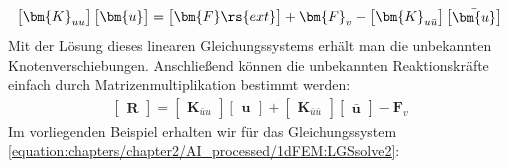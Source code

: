 \documentclass[letterpaper,10pt,german]{jupyterBook}
\begin{document}
\begin{equation}\label{equation:chapters/chapter2/1dFEM:LGSsolve2}
\begin{split}\begin{bmatrix}
\bm{K}_{uu}
\end{bmatrix}
\begin{bmatrix}
\bm{u}
\end{bmatrix} = \begin{bmatrix} \bm{F}\rs{ext}\end{bmatrix} + \bm{F}_v - \begin{bmatrix}
\bm{K}_{u\bar{u}} 
\end{bmatrix} \begin{bmatrix}
\bar{\bm{u}}
\end{bmatrix}\end{split}
\end{equation}
\sphinxAtStartPar
Mit der Lösung dieses linearen Gleichungssystems erhält man die unbekannten Knotenverschiebungen. Anschließend können die unbekannten Reaktionskräfte einfach durch Matrizenmultiplikation bestimmt werden:
\begin{equation}\label{equation:chapters/chapter2/1dFEM:LGSsolve3}
\begin{split}\begin{bmatrix} \bm{R} \end{bmatrix} = 
\begin{bmatrix}
\bm{K}_{\bar{u}u}
\end{bmatrix}
\begin{bmatrix}
\bm{u}
\end{bmatrix} + \begin{bmatrix}
\bm{K}_{\bar{u}\bar{u}} 
\end{bmatrix} \begin{bmatrix}
\bar{\bm{u}}
\end{bmatrix}- \bm{F}_v\end{split}
\end{equation}
\sphinxAtStartPar
Im vorliegenden Beispiel erhalten wir für das Gleichungssystem \eqref{equation:chapters/chapter2/AI_processed/1dFEM:LGSsolve2}:
\end{document}
